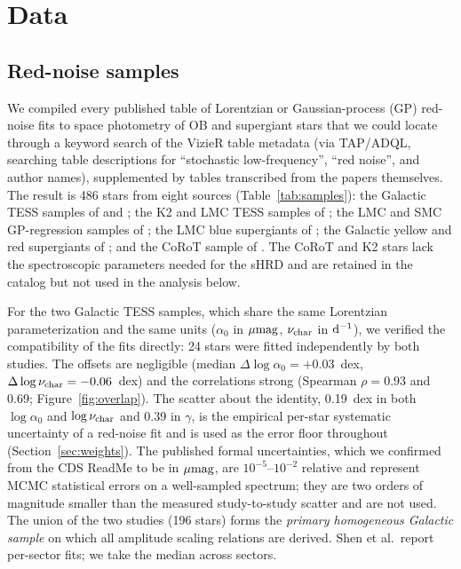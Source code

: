 \documentclass[twocolumn]{aastex631}
\newcommand{\nuchar}{\nu_{\rm char}}
\newcommand{\umag}{\mu{\rm mag}}
\newcommand{\dinv}{{\rm d}^{-1}}
\begin{document}
\section{Data}\label{sec:data}

\subsection{Red-noise samples}\label{sec:rednoise}

We compiled every published table of Lorentzian or Gaussian-process (GP) red-noise fits to space photometry of OB and supergiant stars that we could locate through a keyword search of the VizieR table metadata (via TAP/ADQL, searching table descriptions for ``stochastic low-frequency'', ``red noise'', and author names), supplemented by tables transcribed from the papers themselves. The result is 486 stars from eight sources (Table~\ref{tab:samples}): the Galactic TESS samples of \citet[70 stars]{bowman2020} and \citet[150 stars, of which 126 are not in Bowman et al.]{shen2024}; the K2 and LMC TESS samples of \citet{bowman2019b}; the LMC and SMC GP-regression samples of \citet{bowman2024}; the LMC blue supergiants of \citet{ma2024}; the Galactic yellow and red supergiants of \citet{dornwallenstein2020}; and the CoRoT sample of \citet{bowman2019a}. The CoRoT and K2 stars lack the spectroscopic parameters needed for the sHRD and are retained in the catalog but not used in the analysis below.

For the two Galactic TESS samples, which share the same Lorentzian parameterization and the same units ($\alpha_0$ in $\umag$, $\nuchar$ in $\dinv$), we verified the compatibility of the fits directly: 24 stars were fitted independently by both studies. The offsets are negligible (median $\Delta\log\alpha_0=+0.03$~dex, $\Delta\log\nuchar=-0.06$~dex) and the correlations strong (Spearman $\rho=0.93$ and 0.69; Figure~\ref{fig:overlap}). The scatter about the identity, 0.19~dex in both $\log\alpha_0$ and $\log\nuchar$ and 0.39 in $\gamma$, is the empirical per-star systematic uncertainty of a red-noise fit and is used as the error floor throughout (Section~\ref{sec:weights}). The published formal uncertainties, which we confirmed from the CDS ReadMe to be in $\umag$, are $10^{-5}$--$10^{-2}$ relative and represent MCMC statistical errors on a well-sampled spectrum; they are two orders of magnitude smaller than the measured study-to-study scatter and are not used. The union of the two studies (196 stars) forms the \emph{primary homogeneous Galactic sample} on which all amplitude scaling relations are derived. Shen et al.\ report per-sector fits; we take the median across sectors.
\end{document}
